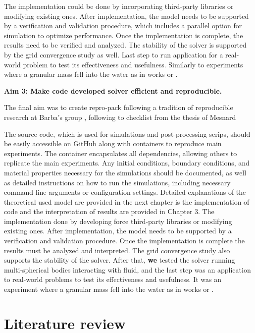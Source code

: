 The implementation could be done by incorporating third-party libraries or modifying existing ones. After implementation, the model needs to be supported by a verification and validation procedure, which includes a parallel option for simulation to optimize performance. Once the implementation is complete, the results need to be verified and analyzed. The stability of the solver is supported by the grid convergence study as well. Last step to run application for a real-world problem to test its effectiveness and usefulness. Similarly to experiments where a granular mass fell into the water as in works \cite{mao2020resolved} or \cite{shen2022resolved}.

\textbf{Aim 3: Make code developed solver efficient and reproducible.}

The final aim was to create repro-pack following a tradition of reproducible research at Barba's group \cite{barba2018terminologies}, following to checklist from the thesis of Mesnard \cite{Mesnard2023}


The source code, which is used for simulations and post-processing scrips, should be easily accessible on GitHub \cite{github} along with containers \cite{Docker_introduction} to reproduce main experiments. The container encapsulates all dependencies, allowing others to replicate the main experiments. Any initial conditions, boundary conditions, and material properties necessary for the simulations should be documented, as well as detailed instructions on how to run the simulations, including necessary command line arguments or configuration settings. Detailed explanations of the theoretical used model are provided in the next chapter is the implementation of code and the interpretation of results are provided in Chapter 3. The implementation done by developing force  third-party libraries or modifying existing ones. After implementation, the model needs to be supported by a verification and validation procedure. Once the implementation is complete the results must be analyzed and interpreted. The grid convergence study also supports the stability of the solver. After that, \textbf{we} tested the solver running multi-spherical bodies interacting with fluid, and the last step was an application to real-world problems to test its effectiveness and usefulness. It was an experiment where a granular mass fell into the water as in works \cite{mao2020resolved} or \cite{shen2022resolved}.
\newpage
\section{Literature review}

